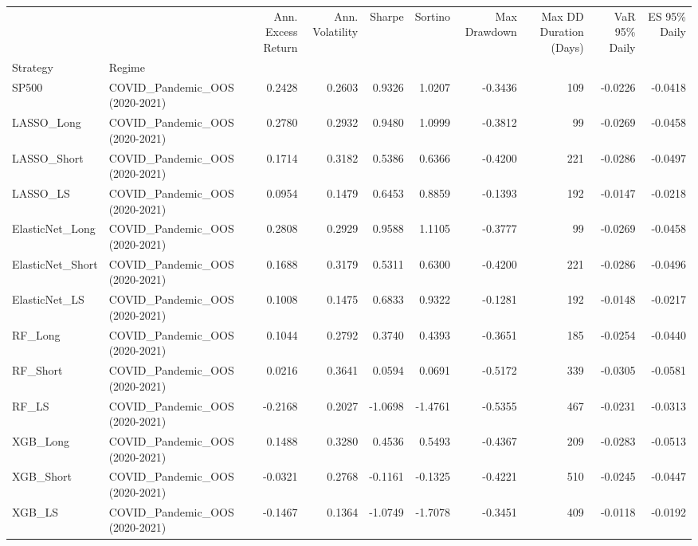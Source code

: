 \begin{tabular}{llrrrrrrrr}
\toprule
 &  & Ann. Excess Return & Ann. Volatility & Sharpe & Sortino & Max Drawdown & Max DD Duration (Days) & VaR 95\% Daily & ES 95\% Daily \\
Strategy & Regime &  &  &  &  &  &  &  &  \\
\midrule
SP500 & COVID\_Pandemic\_OOS (2020-2021) & 0.2428 & 0.2603 & 0.9326 & 1.0207 & -0.3436 & 109 & -0.0226 & -0.0418 \\
\cline{1-10}
LASSO\_Long & COVID\_Pandemic\_OOS (2020-2021) & 0.2780 & 0.2932 & 0.9480 & 1.0999 & -0.3812 & 99 & -0.0269 & -0.0458 \\
\cline{1-10}
LASSO\_Short & COVID\_Pandemic\_OOS (2020-2021) & 0.1714 & 0.3182 & 0.5386 & 0.6366 & -0.4200 & 221 & -0.0286 & -0.0497 \\
\cline{1-10}
LASSO\_LS & COVID\_Pandemic\_OOS (2020-2021) & 0.0954 & 0.1479 & 0.6453 & 0.8859 & -0.1393 & 192 & -0.0147 & -0.0218 \\
\cline{1-10}
ElasticNet\_Long & COVID\_Pandemic\_OOS (2020-2021) & 0.2808 & 0.2929 & 0.9588 & 1.1105 & -0.3777 & 99 & -0.0269 & -0.0458 \\
\cline{1-10}
ElasticNet\_Short & COVID\_Pandemic\_OOS (2020-2021) & 0.1688 & 0.3179 & 0.5311 & 0.6300 & -0.4200 & 221 & -0.0286 & -0.0496 \\
\cline{1-10}
ElasticNet\_LS & COVID\_Pandemic\_OOS (2020-2021) & 0.1008 & 0.1475 & 0.6833 & 0.9322 & -0.1281 & 192 & -0.0148 & -0.0217 \\
\cline{1-10}
RF\_Long & COVID\_Pandemic\_OOS (2020-2021) & 0.1044 & 0.2792 & 0.3740 & 0.4393 & -0.3651 & 185 & -0.0254 & -0.0440 \\
\cline{1-10}
RF\_Short & COVID\_Pandemic\_OOS (2020-2021) & 0.0216 & 0.3641 & 0.0594 & 0.0691 & -0.5172 & 339 & -0.0305 & -0.0581 \\
\cline{1-10}
RF\_LS & COVID\_Pandemic\_OOS (2020-2021) & -0.2168 & 0.2027 & -1.0698 & -1.4761 & -0.5355 & 467 & -0.0231 & -0.0313 \\
\cline{1-10}
XGB\_Long & COVID\_Pandemic\_OOS (2020-2021) & 0.1488 & 0.3280 & 0.4536 & 0.5493 & -0.4367 & 209 & -0.0283 & -0.0513 \\
\cline{1-10}
XGB\_Short & COVID\_Pandemic\_OOS (2020-2021) & -0.0321 & 0.2768 & -0.1161 & -0.1325 & -0.4221 & 510 & -0.0245 & -0.0447 \\
\cline{1-10}
XGB\_LS & COVID\_Pandemic\_OOS (2020-2021) & -0.1467 & 0.1364 & -1.0749 & -1.7078 & -0.3451 & 409 & -0.0118 & -0.0192 \\

\end{tabular}
